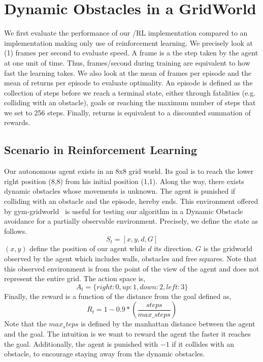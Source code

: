 \section{Dynamic Obstacles in a GridWorld} 
\label{gridworlddyn}
We first evaluate the performance of our \dio{}/RL implementation compared to an implementation making only use of reinforcement learning. 
We precisely look at (1) frames per second to evaluate speed. A \gls{frame} is a the step taken by the agent at one unit of time. Thus, frames/second 
during training are equivalent to how fast the learning takes. We also look at the mean of frames per episode and the mean of returns per episode to evaluate 
optimality. An \gls{episode} is defined as the collection of steps before we reach a terminal state, either 
through fatalities (e.g. colliding with an obstacle), goals or reaching the maximum number of steps that we set to 256 steps.
Finally, \glspl{return} is equivalent to a discounted summation of rewards. 
\subsection{Scenario in Reinforcement Learning}

Our autonomous agent exists in an 8x8 grid world. Its goal is to reach
the lower right position (8,8) from his initial position (1,1).
Along the way, there exists dynamic obstacles whose movements is
unknown. The agent is punished if colliding with an obstacle and the
\gls{episode}, hereby ends. 
This environment offered by gym-gridworld~\cite{gym_minigrid} is useful for testing our algorithm in a Dynamic Obstacle avoidance for a partially observable 
environment. Precisely, we define the state as follows. 
\begin{equation*}
  S_t = [x, y, d, G]
\end{equation*}
$(x,y)$ define the position of our agent while $d$ its direction. $G$
is the gridworld observed by the agent which includes walls, obstacles
and free squares. Note that this observed environment is from the point of the view 
of the agent and does not represent the entire grid. 
The action space is, 
\begin{equation*}
  A_t = \{ right: 0, up: 1, down: 2, left: 3 \}
\end{equation*}
Finally, the reward is a function of the distance from the goal
defined as, 
\begin{equation*}
  R_t = 1 - 0.9*(\dfrac{steps}{max\_steps})
\end{equation*}
Note that the $max_steps$ is defined by the manhattan distance between the agent and the goal. The intuition is 
we want to reward the agent the faster it reaches the goal. Additionally, the agent is punished with $-1$ if it collides with 
an obstacle, to encourage staying away from the dynamic obstacles. 
\newpage

